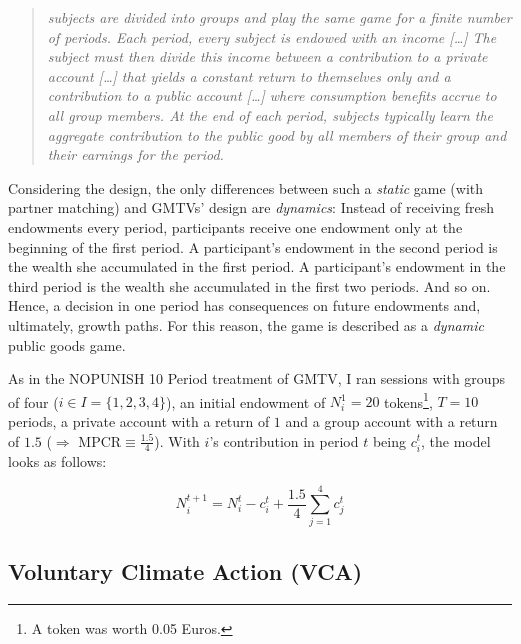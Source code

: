 \documentclass[
  authoryear,
  review,
  3p,
  onecolumn]{elsarticle}
\begin{document}
\begin{quote}
\emph{subjects are divided into groups and play the same game for a
finite number of periods. Each period, every subject is endowed with an
income {[}\ldots{]} The subject must then divide this income between a
contribution to a private account {[}\ldots{]} that yields a constant
return to themselves only and a contribution to a public account
{[}\ldots{]} where consumption benefits accrue to all group members. At
the end of each period, subjects typically learn the aggregate
contribution to the public good by all members of their group and their
earnings for the period.}
\end{quote}

Considering the design, the only differences between such a
\emph{static} game (with partner matching) and GMTVs' design are
\emph{dynamics}: Instead of receiving fresh endowments every period,
participants receive one endowment only at the beginning of the first
period. A participant's endowment in the second period is the wealth she
accumulated in the first period. A participant's endowment in the third
period is the wealth she accumulated in the first two periods. And so
on. Hence, a decision in one period has consequences on future
endowments and, ultimately, growth paths. For this reason, the game is
described as a \emph{dynamic} public goods game.

As in the NOPUNISH 10 Period treatment of GMTV, I ran sessions with
groups of four (\(i \in I=\{1,2,3,4\}\)), an initial endowment of
\(N_i^1 = 20\) tokens\footnote{A token was worth 0.05 Euros.}, \(T=10\)
periods, a private account with a return of \(1\) and a group account
with a return of \(1.5\) (\(\Rightarrow\) MPCR\(\equiv \frac{1.5}{4}\)).
With \(i\)'s contribution in period \(t\) being \(c_i^t\), the model
looks as follows:

\[
N_i^{t+1}=N_i^t - c_i^t + \frac{1.5}{4}\sum_{j=1}^4 c_j^t
\]

\hypertarget{voluntary-climate-action-vca}{%
\subsection{Voluntary Climate Action
(VCA)}\label{voluntary-climate-action-vca}}
\end{document}
